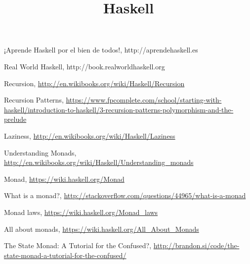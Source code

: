 \documentclass{article}
\title{Haskell}
\begin{document}
  \lstset{language=Haskell}
  \maketitle

  

  

  



\begin{thebibliography}{3}

  ¡Aprende Haskell por el bien de todos!, http://aprendehaskell.es

  Real World Haskell, http://book.realworldhaskell.org

  Recursion, \url{http://en.wikibooks.org/wiki/Haskell/Recursion}

  Recursion Patterns,
  \url{https://www.fpcomplete.com/school/starting-with-haskell/introduction-to-haskell/3-recursion-patterns-polymorphism-and-the-prelude}

  Laziness, \url{http://en.wikibooks.org/wiki/Haskell/Laziness}

  Understanding Monads, \url{http://en.wikibooks.org/wiki/Haskell/Understanding_monads}

  Monad, \url{https://wiki.haskell.org/Monad}

  What is a monad?, \url{http://stackoverflow.com/questions/44965/what-is-a-monad}

  Monad laws, \url{https://wiki.haskell.org/Monad_laws}

  All about monads, \url{https://wiki.haskell.org/All_About_Monads}

  The State Monad: A Tutorial for the Confused?, \url{http://brandon.si/code/the-state-monad-a-tutorial-for-the-confused/}

\end{thebibliography}
\end{document}
